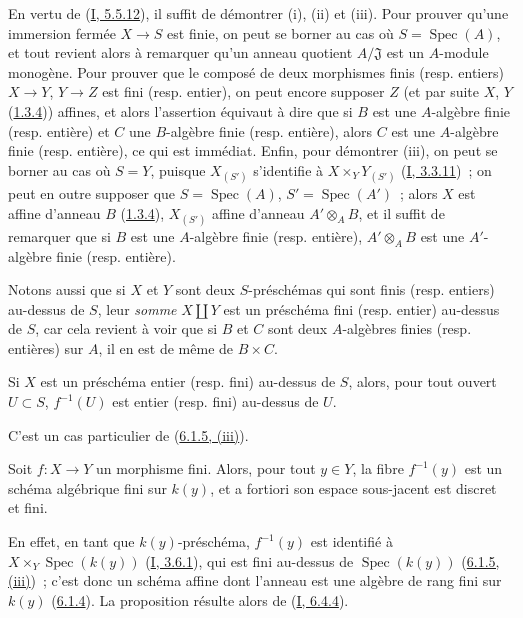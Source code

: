 
En vertu de (\hyperref[I.5.5.12-fr]{I, 5.5.12}), il suffit de démontrer (i),
(ii) et (iii). Pour prouver qu'une immersion fermée $X\to S$ est finie, on
peut se borner au cas où $S=\operatorname{Spec}(A)$, et tout revient alors à
remarquer qu'un anneau quotient $A/\mathfrak{J}$ est un $A$-module monogène.
Pour prouver que le composé de deux morphismes finis (resp. entiers) $X\to Y$,
$Y\to Z$ est fini (resp. entier), on peut encore supposer $Z$ (et par suite
$X$, $Y$ (\hyperref[II.1.3.4-fr]{1.3.4})) affines, et alors l'assertion
équivaut à dire que si $B$ est une $A$-algèbre finie (resp. entière) et $C$
une $B$-algèbre finie (resp. entière), alors $C$ est une $A$-algèbre finie
(resp. entière), ce qui est immédiat. Enfin, pour démontrer (iii), on peut se
borner au cas où $S=Y$, puisque $X_{(S')}$ s'identifie à
$X\times_Y Y_{(S')}$ (\hyperref[I.3.3.11-fr]{I, 3.3.11})~; on peut en outre
supposer que $S=\operatorname{Spec}(A)$, $S'=\operatorname{Spec}(A')$~; alors
$X$ est affine d'anneau $B$ (\hyperref[II.1.3.4-fr]{1.3.4}), $X_{(S')}$
affine d'anneau $A'\otimes_A B$, et il suffit de remarquer que si $B$ est une
$A$-algèbre finie (resp. entière), $A'\otimes_A B$ est une $A'$-algèbre finie
(resp. entière).

Notons aussi que si $X$ et $Y$ sont deux $S$-préschémas qui sont finis (resp.
entiers) au-dessus de $S$, leur \emph{somme} $X\amalg Y$ est un préschéma fini
(resp. entier) au-dessus de $S$, car cela revient à voir que si $B$ et $C$
sont deux $A$-algèbres finies (resp. entières) sur $A$, il en est de même de
$B\times C$.

\begin{corollary}[6.1.6]
\label{II.6.1.6-fr}
Si $X$ est un préschéma entier (resp. fini) au-dessus de $S$, alors, pour tout
ouvert $U\subset S$, $f^{-1}(U)$ est entier (resp. fini) au-dessus de $U$.
\end{corollary}

C'est un cas particulier de (\hyperref[II.6.1.5-fr]{6.1.5, (iii)}).

\begin{corollary}[6.1.7]
\label{II.6.1.7-fr}
Soit $f:X\to Y$ un morphisme fini. Alors, pour tout $y\in Y$, la fibre
$f^{-1}(y)$ est un schéma algébrique fini sur $k(y)$, et a fortiori son
espace sous-jacent est discret et fini.
\end{corollary}

En effet, en tant que $k(y)$-préschéma, $f^{-1}(y)$ est identifié à
$X\times_Y\operatorname{Spec}(k(y))$ (\hyperref[I.3.6.1-fr]{I, 3.6.1}), qui
est fini au-dessus de $\operatorname{Spec}(k(y))$
(\hyperref[II.6.1.5-fr]{6.1.5, (iii)})~; c'est donc un schéma affine dont
l'anneau est une algèbre de rang fini sur $k(y)$
(\hyperref[II.6.1.4-fr]{6.1.4}). La proposition résulte alors de
(\hyperref[I.6.4.4-fr]{I, 6.4.4}).

